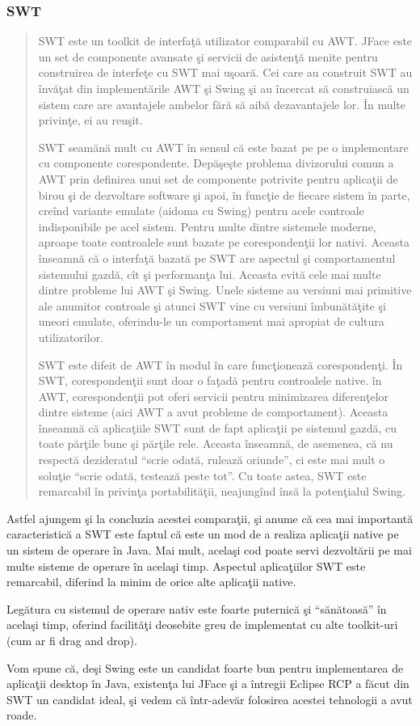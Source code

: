 \subsubsection{SWT}

\begin{quotation}

SWT este un toolkit de interfaţă utilizator comparabil cu AWT. JFace este un set
de componente avansate şi servicii de asistenţă menite pentru construirea de
interfeţe cu SWT mai uşoară. Cei care au construit SWT au învăţat din
implementările AWT şi Swing şi au încercat să construiască un sistem care are
avantajele ambelor fără să aibă dezavantajele lor. În multe privinţe, ei au
reuşit.

SWT seamănă mult cu AWT în sensul că este bazat pe pe o implementare cu
componente corespondente. Depăşeşte problema divizorului comun a AWT prin
definirea unui set de componente potrivite pentru aplicaţii de birou şi de
dezvoltare software şi apoi, în funcţie de fiecare sistem în parte, creînd
variante emulate (aidoma cu Swing) pentru acele controale indisponibile pe acel
sistem. Pentru multe dintre sistemele moderne, aproape toate controalele sunt
bazate pe corespondenţii lor nativi. Aceasta înseamnă că o interfaţă bazată pe
SWT are aspectul şi comportamentul sistemului gazdă, cît şi performanţa lui.
Aceasta evită cele mai multe dintre probleme lui AWT şi Swing. Unele sisteme au
versiuni mai primitive ale anumitor controale şi atunci SWT vine cu versiuni
îmbunătăţite şi uneori emulate, oferindu-le un comportament mai apropiat de
cultura utilizatorilor.

SWT este difeit de AWT în modul în care funcţionează corespondenţi. În SWT,
corespondenţii sunt doar o faţadă pentru controalele native. în AWT,
corespondenţii pot oferi servicii pentru minimizarea diferenţelor dintre sisteme
(aici AWT a avut probleme de comportament). Aceasta înseamnă că aplicaţiile SWT
sunt de fapt aplicaţii pe sistemul gazdă, cu toate părţile bune şi părţile rele.
Aceasta înseamnă, de asemenea, că nu respectă dezideratul ``scrie odată, rulează
oriunde'', ci este mai mult o soluţie ``scrie odată, testează peste tot''. Cu
toate astea, SWT este remarcabil în privinţa portabilităţii, neajungînd însă la
potenţialul Swing.
\cite{swtawtswing}
\end{quotation}

Astfel ajungem şi la concluzia acestei comparaţii, şi anume că cea mai
importantă caracteristică a SWT este faptul că este un mod de a realiza
aplicaţii native pe un sistem de operare în Java. Mai mult, acelaşi cod poate
servi dezvoltării pe mai multe sisteme de operare în acelaşi timp.  Aspectul
aplicaţiilor SWT este remarcabil, diferind la minim de orice alte aplicaţii
native.

Legătura cu sistemul de operare nativ este foarte puternică şi ``sănătoasă'' în
acelaşi timp, oferind facilităţi deosebite greu de implementat cu alte
toolkit-uri (cum ar fi drag and drop).

Vom spune că, deşi Swing este un candidat foarte bun pentru implementarea de
aplicaţii desktop în Java, existenţa lui JFace şi a întregii Eclipse RCP a făcut
din SWT un candidat ideal, şi vedem că într-adevăr folosirea acestei tehnologii
a avut roade.
